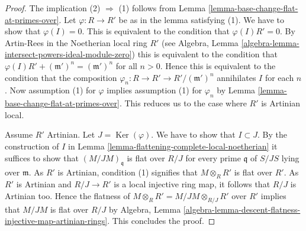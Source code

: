 \documentclass[10pt,a4paper]{amsart}
\theoremstyle{plain}
\theoremstyle{definition}
\theoremstyle{remark}
\numberwithin{equation}{subsection}
\def\Ker{\mathop{\mathrm{Ker}}}
\begin{document}
\begin{proof}
The implication (2) $\Rightarrow$ (1) follows from
Lemma \ref{lemma-base-change-flat-at-primes-over}.
Let $\varphi : R \to R'$ be as in the lemma satisfying (1).
We have to show that $\varphi(I) = 0$.
This is equivalent to the condition that $\varphi(I)R' = 0$.
By Artin-Rees in the Noetherian local ring $R'$ (see
Algebra, Lemma \ref{algebra-lemma-intersect-powers-ideal-module-zero})
this is equivalent to the condition that
$\varphi(I)R' + (\mathfrak m')^n = (\mathfrak m')^n$ for all $n > 0$.
Hence this is equivalent to the condition that the composition
$\varphi_n : R \to R' \to R'/(\mathfrak m')^n$ annihilates $I$ for each $n$.
Now assumption (1) for $\varphi$ implies assumption (1) for
$\varphi_n$ by
Lemma \ref{lemma-base-change-flat-at-primes-over}.
This reduces us to the case where $R'$ is Artinian local.

\medskip\noindent
Assume $R'$ Artinian. Let $J = \Ker(\varphi)$. We have to show that
$I \subset J$. By the construction of $I$ in
Lemma \ref{lemma-flattening-complete-local-noetherian}
it suffices to show that $(M/JM)_{\mathfrak q}$ is flat over $R/J$
for every prime $\mathfrak q$ of $S/JS$ lying over $\mathfrak m$.
As $R'$ is Artinian, condition (1) signifies that $M \otimes_R R'$
is flat over $R'$. As $R'$ is Artinian and $R/J \to R'$ is a local
injective ring map, it follows that $R/J$ is Artinian
too. Hence the flatness of $M \otimes_R R' = M/JM \otimes_{R/J} R'$ over
$R'$ implies that $M/JM$ is flat over $R/J$ by
Algebra,
Lemma \ref{algebra-lemma-descent-flatness-injective-map-artinian-rings}.
This concludes the proof.
\end{proof}
\end{document}
